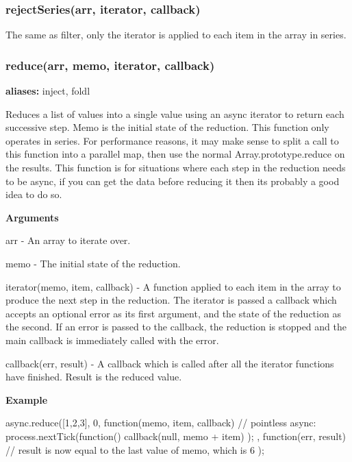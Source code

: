 \label{_rejectSeries}%
 \subsubsection*{reject\+Series(arr, iterator, callback)}

The same as filter, only the iterator is applied to each item in the array in series.





\label{_reduce}%
 \subsubsection*{reduce(arr, memo, iterator, callback)}

{\bfseries aliases\+:} inject, foldl

Reduces a list of values into a single value using an async iterator to return each successive step. Memo is the initial state of the reduction. This function only operates in series. For performance reasons, it may make sense to split a call to this function into a parallel map, then use the normal Array.\+prototype.\+reduce on the results. This function is for situations where each step in the reduction needs to be async, if you can get the data before reducing it then its probably a good idea to do so.

{\bfseries Arguments}


\begin{DoxyItemize}
\item arr -\/ An array to iterate over.
\item memo -\/ The initial state of the reduction.
\item iterator(memo, item, callback) -\/ A function applied to each item in the array to produce the next step in the reduction. The iterator is passed a callback which accepts an optional error as its first argument, and the state of the reduction as the second. If an error is passed to the callback, the reduction is stopped and the main callback is immediately called with the error.
\item callback(err, result) -\/ A callback which is called after all the iterator functions have finished. Result is the reduced value.
\end{DoxyItemize}

{\bfseries Example} \begin{DoxyVerb}async.reduce([1,2,3], 0, function(memo, item, callback){
    // pointless async:
    process.nextTick(function(){
        callback(null, memo + item)
    });
}, function(err, result){
    // result is now equal to the last value of memo, which is 6
});
\end{DoxyVerb}






